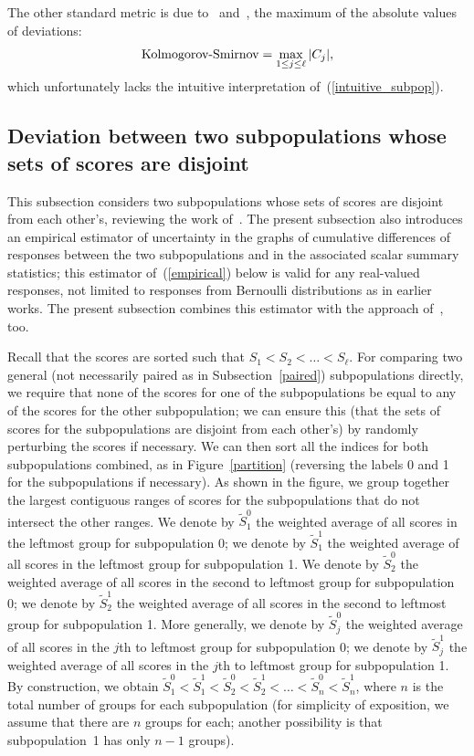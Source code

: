 \documentclass[]{fairmeta}
\begin{document}
The other standard metric is due to~\cite{kolmogorov} and~\cite{smirnov},
the maximum of the absolute values of deviations:
%
\begin{equation}
\hbox{Kolmogorov-Smirnov} = \max_{1 \le j \le \ell} |C_j|,
\end{equation}
%
which unfortunately lacks the intuitive interpretation
of~(\ref{intuitive_subpop}).


\subsection{Deviation between two subpopulations
            whose sets of scores are disjoint}
\label{disjoint}

This subsection considers two subpopulations whose sets of scores are disjoint
from each other's, reviewing the work of~\cite{tygert_two}.
The present subsection also introduces an empirical estimator of uncertainty
in the graphs of cumulative differences of responses
between the two subpopulations and in the associated scalar summary statistics;
this estimator of~(\ref{empirical}) below is valid
for any real-valued responses, not limited to responses
from Bernoulli distributions as in earlier works.
The present subsection combines this estimator with the approach
of~\cite{tygert_pvals}, too.

Recall that the scores are sorted such that $S_1 < S_2 < \dots < S_{\ell}$.
For comparing two general (not necessarily paired
as in Subsection~\ref{paired}) subpopulations directly,
we require that none of the scores for one of the subpopulations
be equal to any of the scores for the other subpopulation; we can ensure this
(that the sets of scores for the subpopulations are disjoint
from each other's) by randomly perturbing the scores if necessary.
We can then sort all the indices for both subpopulations combined,
as in Figure~\ref{partition}
(reversing the labels 0 and 1 for the subpopulations if necessary).
As shown in the figure, we group together the largest contiguous ranges
of scores for the subpopulations that do not intersect the other ranges.
We denote by $\tilde{S}_1^0$ the weighted average
of all scores in the leftmost group for subpopulation 0;
we denote by $\tilde{S}_1^1$ the weighted average
of all scores in the leftmost group for subpopulation 1.
We denote by $\tilde{S}_2^0$ the weighted average
of all scores in the second to leftmost group for subpopulation 0;
we denote by $\tilde{S}_2^1$ the weighted average
of all scores in the second to leftmost group for subpopulation 1.
More generally, we denote by $\tilde{S}_j^0$ the weighted average
of all scores in the $j$th to leftmost group for subpopulation 0;
we denote by $\tilde{S}_j^1$ the weighted average
of all scores in the $j$th to leftmost group for subpopulation 1.
By construction, we obtain
$\tilde{S}_1^0 < \tilde{S}_1^1 < \tilde{S}_2^0 < \tilde{S}_2^1 < \dots
< \tilde{S}_n^0 < \tilde{S}_n^1$,
where $n$ is the total number of groups for each subpopulation
(for simplicity of exposition, we assume that there are $n$ groups for each;
another possibility is that subpopulation~1 has only $n-1$ groups).
\end{document}
